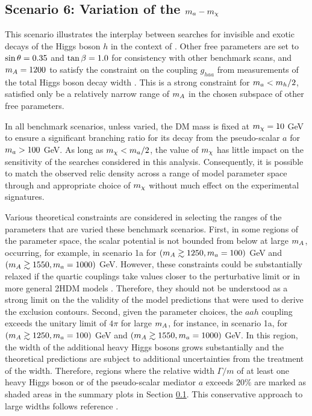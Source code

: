 \subsection{Scenario 6: Variation of the \texorpdfstring{$m_a-m_{\chi}$}{TEXT} }
\label{subsection:ma-mchi-scan}
This scenario illustrates the interplay between searches for invisible and exotic decays of the Higgs boson $h$ in the context of \hdma. 
Other free parameters are set to $\sin\theta=0.35$ and $\tan\beta=1.0$ for consistency with other benchmark scans, 
and $m_A=1200$ to satisfy the constraint on the coupling $g_{haa}$ from measurements of the total Higgs boson decay width \cite{Argyropoulos:2022ezr}. 
This is a strong constraint for $m_a<m_h/2$, satisfied only be a relatively narrow range of $m_A$ in the chosen subspace of other free parameters.

In all benchmark scenarios, unless varied, the DM mass is fixed at $m_{\chi}=10$ GeV to ensure a significant branching ratio for its decay from the pseudo-scalar $a$ for $m_a>100$ GeV. 
As long as $m_{\chi}<m_a/2$, the value of $m_{\chi}$ has little impact on the sensitivity of the searches considered in this analysis. 
Consequently, it is possible to match the observed relic density across a range of model parameter space through and appropriate choice of $m_{\chi}$ without much effect on the experimental signatures.

Various theoretical constraints are considered in selecting the ranges of the parameters that are varied these benchmark scenarios. 
First, in some regions of the parameter space, the scalar potential is not bounded from below at large $m_A$, occurring, 
for example, in scenario 1a for $(m_A\gtrsim1250,m_a=100)$ GeV and $(m_A\gtrsim1550,m_a=1000)$ GeV. 
However, these constraints could be substantially relaxed if the quartic couplings take values closer 
to the perturbative limit or in more general 2HDM models \cite{2HDMWGproxi,Bauer:2017ota,Haisch:2018djm}. 
Therefore, they should not be understood as a strong limit on the the validity of the model predictions 
that were used to derive the exclusion contours. 
Second, given the parameter choices, the $aah$ coupling exceeds the unitary limit of $4\pi$ for large $m_A$, 
for instance, in scenario 1a, for $(m_A\gtrsim1250,m_a=100)$ GeV and $(m_A\gtrsim1550,m_a=1000)$ GeV. 
In this region, the width of the additional heavy Higgs bosons grows substantially and the theoretical 
predictions are subject to additional uncertainties from the treatment of the width. 
Therefore, regions where the relative width $\Gamma/m$ of at least one heavy Higgs boson or of the 
pseudo-scalar mediator $a$ exceeds $20\%$ are marked as shaded areas in the summary plots in Section \ref{subsection:ma-mchi-scan}. 
This conservative approach to large widths follows reference \cite{EXOT-2017-32}.

